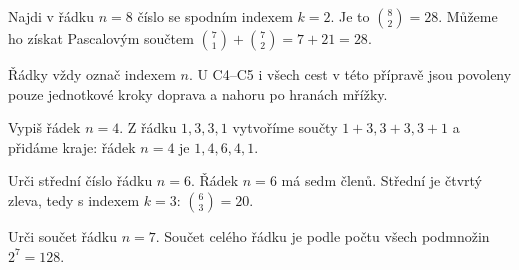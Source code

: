 \documentclass[11pt,a4paper]{article}
\begin{document}
\begin{center}
\end{center}

\begin{prikladReseniBox}[title={Příklad P5}]
Najdi v řádku \(n=8\) číslo se spodním indexem \(k=2\).
\tcblower
Je to \(\binom82=28\). Můžeme ho získat Pascalovým součtem \(\binom71+\binom72=7+21=28\).
\end{prikladReseniBox}


\newpage
{}

Řádky vždy označ indexem $n$. U C4–C5 i všech cest v této přípravě jsou povoleny pouze jednotkové kroky doprava a nahoru po hranách mřížky.

\begin{zadaniReseniBox}[title={Úloha C1}]
Vypiš řádek \(n=4\).
\tcblower
Z řádku $1,3,3,1$ vytvoříme součty $1+3,3+3,3+1$ a přidáme kraje: řádek $n=4$ je $1,4,6,4,1$.
\end{zadaniReseniBox}

\begin{zadaniReseniBox}[title={Úloha C2}]
Urči střední číslo řádku \(n=6\).
\tcblower
Řádek $n=6$ má sedm členů. Střední je čtvrtý zleva, tedy s indexem $k=3$: $\binom63=20$.
\end{zadaniReseniBox}

\begin{zadaniReseniBox}[title={Úloha C3}]
Urči součet řádku \(n=7\).
\tcblower
Součet celého řádku je podle počtu všech podmnožin $2^7=128$.
\end{zadaniReseniBox}
\end{document}

